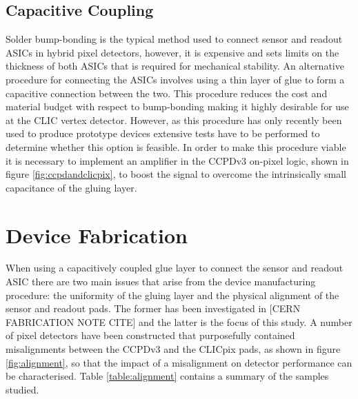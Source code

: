 
\subsection{Capacitive Coupling}

Solder bump-bonding is the typical method used to connect sensor and readout ASICs in hybrid pixel detectors, however, it is expensive and sets limits on the thickness of both ASICs that is required for mechanical stability.  An alternative procedure for connecting the ASICs involves using a thin layer of glue to form a capacitive connection between the two.  This procedure reduces the cost and material budget with respect to bump-bonding making it highly desirable for use at the CLIC vertex detector.  However, as this procedure has only recently been used to produce prototype devices extensive tests have to be performed to determine whether this option is feasible.  In order to make this procedure viable it is necessary to implement an amplifier in the CCPDv3 on-pixel logic, shown in figure \ref{fig:ccpdandclicpix}, to boost the signal to overcome the intrinsically small capacitance of the gluing layer.


\section{Device Fabrication}

When using a capacitively coupled glue layer to connect the sensor and readout ASIC there are two main issues that arise from the device manufacturing procedure: the uniformity of the gluing layer and the physical alignment of the sensor and readout pads.  The former has been investigated in [CERN FABRICATION NOTE CITE] and the latter is the focus of this study.  A number of pixel detectors have been constructed that purposefully contained misalignments between the CCPDv3 and the CLICpix pads, as shown in figure \ref{fig:alignment}, so that the impact of a misalignment on detector performance can be characterised.  Table \ref{table:alignment} contains a summary of the samples studied.

